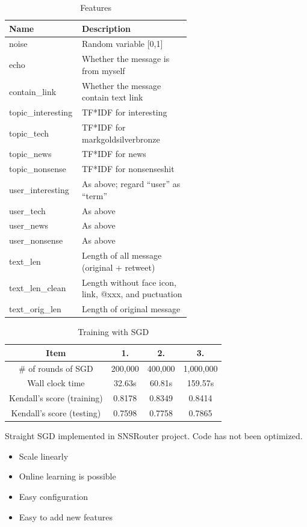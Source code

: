 \documentclass{sig-alternate}
\begin{document}
\begin{table}[t!]
	\caption{Features}
	\centering
	\begin{tabular}{|l|p{0.6\linewidth}|}
		\hline
		Name & Description \\
		\hline
		noise & Random variable [0,1]\\
		echo & Whether the message is from myself\\
		contain\_link & Whether the message contain text link\\
		topic\_interesting & TF*IDF for {interesting}\\
		topic\_tech & TF*IDF for {mark}{gold}{silver}{bronze}\\
		topic\_news & TF*IDF for {news}\\
		topic\_nonsense & TF*IDF for {nonsense}{shit}\\
		user\_interesting & As above; regard ``user'' as ``term''\\
		user\_tech & As above\\
		user\_news & As above\\
		user\_nonsense & As above\\
		text\_len & Length of all message (original + retweet)\\
		text\_len\_clean & Length without face icon, link, @xxx, and puctuation\\
		text\_orig\_len & Length of original message\\
		\hline
	\end{tabular}
\end{table}

\begin{table}
	\centering
	\caption{Training with SGD}
	\begin{tabular}{|c|c|c|c|}
	\hline
	Item & 1. & 2. & 3. \\
	\hline
	\# of rounds of SGD & 200,000 & 400,000 & 1,000,000\\
	Wall clock time & 32.63s & 60.81s & 159.57s\\
	Kendall's score (training) & 0.8178 & 0.8349 & 0.8414\\
	Kendall's score (testing) & 0.7598 & 0.7758 & 0.7865\\
	\hline
	\end{tabular}
\end{table}

Straight SGD implemented in SNSRouter project. Code has not been optimized.

\begin{itemize}
	\item Scale linearly
	\item Online learning is possible
	\item Easy configuration
	\item Easy to add new features
\end{itemize}
\end{document}
